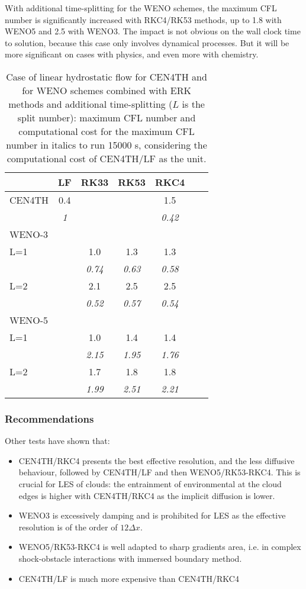 With additional time-splitting for the WENO schemes, the maximum CFL number is significantly increased with RKC4/RK53 methods, up to 1.8 with WENO5 and 2.5 with WENO3. The impact is not obvious on the wall clock time to solution, because this case only involves dynamical processes. But it will be more significant on cases with physics, and even more with chemistry.



\begin{table}[ht]
\centering
\begin{tabular}{ l c c c c c c}
\hline\hline
       &  LF  &  RK33 & RK53 & RKC4 \\
\hline
CEN4TH & 0.4 &  &  &  1.5 \\
& \it{1} &  &  & \it{0.42} \\
\hline
WENO-3 &  &  &  &  \\
L=1 &  & 1.0 & 1.3 & 1.3 \\
&  & \it{0.74} & \it{0.63} & \it{0.58} \\
L=2 &  & 2.1 & 2.5 & 2.5 \\
&  & \it{0.52} & \it{0.57} & \it{0.54} \\
\hline
WENO-5 &  &  &  &  \\
L=1 &  & 1.0 & 1.4 & 1.4 \\
&  & \it{2.15} & \it{1.95} & \it{1.76} \\
L=2 &  & 1.7 & 1.8 & 1.8 \\
&  & \it{1.99} & \it{2.51} & \it{2.21} \\
\hline

\end{tabular}
\caption{Case of linear hydrostatic flow for CEN4TH and for WENO schemes combined with ERK methods and additional time-splitting ($L$ is the split number): maximum CFL number and computational cost for the maximum CFL number in italics to run 15000 s, considering the computational cost of CEN4TH/LF as the unit.}
\label{tab:cflH}
\end{table}


\subsubsection{Recommendations}



Other tests have shown that:
\begin{itemize}
\item CEN4TH/RKC4 presents the best effective resolution, and the less diffusive behaviour, followed by CEN4TH/LF and then WENO5/RK53-RKC4. This is crucial for LES of clouds: the entrainment of environmental at the cloud edges is higher with CEN4TH/RKC4 as the implicit diffusion is lower. 
 \item WENO3 is excessively damping and is prohibited for LES as the effective resolution is of the order of $12 \Delta x$.
 \item WENO5/RK53-RKC4 is well adapted to sharp gradients area, i.e. in complex shock-obstacle interactions with immersed boundary method. 
 \item CEN4TH/LF is much more expensive than CEN4TH/RKC4
\end{itemize}

